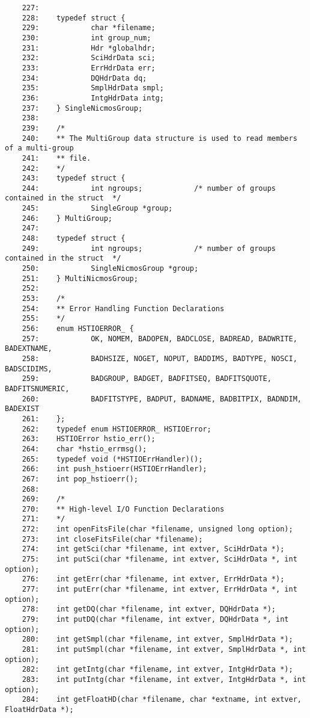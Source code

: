 \begin{scriptsize}
\begin{verbatim}
    227:    
    228:    typedef struct {
    229:            char *filename;
    230:            int group_num;
    231:            Hdr *globalhdr;
    232:            SciHdrData sci;
    233:            ErrHdrData err;
    234:            DQHdrData dq;
    235:            SmplHdrData smpl;
    236:            IntgHdrData intg;
    237:    } SingleNicmosGroup;
    238:    
    239:    /*
    240:    ** The MultiGroup data structure is used to read members of a multi-group
    241:    ** file.
    242:    */
    243:    typedef struct {
    244:            int ngroups;            /* number of groups contained in the struct  */
    245:            SingleGroup *group;
    246:    } MultiGroup;
    247:    
    248:    typedef struct {
    249:            int ngroups;            /* number of groups contained in the struct  */
    250:            SingleNicmosGroup *group;
    251:    } MultiNicmosGroup;
    252:    
    253:    /*
    254:    ** Error Handling Function Declarations
    255:    */
    256:    enum HSTIOERROR_ { 
    257:            OK, NOMEM, BADOPEN, BADCLOSE, BADREAD, BADWRITE, BADEXTNAME, 
    258:            BADHSIZE, NOGET, NOPUT, BADDIMS, BADTYPE, NOSCI, BADSCIDIMS, 
    259:            BADGROUP, BADGET, BADFITSEQ, BADFITSQUOTE, BADFITSNUMERIC, 
    260:            BADFITSTYPE, BADPUT, BADNAME, BADBITPIX, BADNDIM, BADEXIST
    261:    };
    262:    typedef enum HSTIOERROR_ HSTIOError;
    263:    HSTIOError hstio_err();
    264:    char *hstio_errmsg();
    265:    typedef void (*HSTIOErrHandler)();
    266:    int push_hstioerr(HSTIOErrHandler);
    267:    int pop_hstioerr();
    268:    
    269:    /* 
    270:    ** High-level I/O Function Declarations
    271:    */
    272:    int openFitsFile(char *filename, unsigned long option);
    273:    int closeFitsFile(char *filename);
    274:    int getSci(char *filename, int extver, SciHdrData *);
    275:    int putSci(char *filename, int extver, SciHdrData *, int option);
    276:    int getErr(char *filename, int extver, ErrHdrData *);
    277:    int putErr(char *filename, int extver, ErrHdrData *, int option);
    278:    int getDQ(char *filename, int extver, DQHdrData *);
    279:    int putDQ(char *filename, int extver, DQHdrData *, int option);
    280:    int getSmpl(char *filename, int extver, SmplHdrData *);
    281:    int putSmpl(char *filename, int extver, SmplHdrData *, int option);
    282:    int getIntg(char *filename, int extver, IntgHdrData *);
    283:    int putIntg(char *filename, int extver, IntgHdrData *, int option);
    284:    int getFloatHD(char *filename, char *extname, int extver, FloatHdrData *);

\end{verbatim}
\end{scriptsize}
